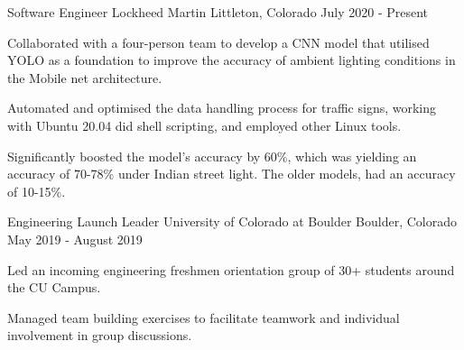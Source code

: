 

\begin{cventries}

  \cventry
    {Software Engineer} %
    {Lockheed Martin} %
    {Littleton, Colorado} %
    {July 2020 - Present} %
    {
      \begin{cvitems} %
        \item {Collaborated with a four-person team to develop a CNN model that utilised YOLO as a foundation to improve the accuracy of ambient lighting conditions in the Mobile net architecture.}
        \item {Automated and optimised the data handling process for traffic signs, working with Ubuntu 20.04 did shell scripting, and employed other Linux tools.}
        \item {Significantly boosted the model's accuracy by 60\%, which was yielding an accuracy of 70-78\% under Indian street light. The older models, had an accuracy of 10-15\%.}
      \end{cvitems}
    }

    \cventry
    {Engineering Launch Leader} %
    {University of Colorado at Boulder} %
    {Boulder, Colorado} %
    {May 2019 - August 2019} %
    {
      \begin{cvitems} %
        \item {Led an incoming engineering freshmen orientation group of 30+ students around the CU Campus.}
        \item {Managed team building exercises to facilitate teamwork and individual involvement in group discussions.}
      \end{cvitems}
    }

\end{cventries}
